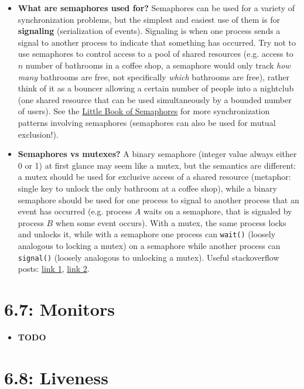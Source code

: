 \documentclass[12pt]{article}
\begin{document}
\begin{itemize}
    \item \textbf{What are semaphores used for?} Semaphores can be used for a variety of synchronization problems, but the simplest and easiest use of them is for \textbf{signaling} (serialization of events). Signaling is when one process sends a signal to another process to indicate that something has occurred. Try not to use semaphores to control access to a pool of shared resources (e.g. access to \(n\) number of bathrooms in a coffee shop, a semaphore would only track \textit{how many} bathrooms are free, not specifically \textit{which} bathrooms are free), rather think of it as a bouncer allowing a certain number of people into a nightclub (one shared resource that can be used simultaneously by a bounded number of users). See the \href{https://greenteapress.com/semaphores/LittleBookOfSemaphores.pdf}{Little Book of Semaphores} for more synchronization patterns involving semaphores (semaphores can also be used for mutual exclusion!).
    \item \textbf{Semaphores vs mutexes?} A binary semaphore (integer value always either 0 or 1) at first glance may seem like a mutex, but the semantics are different: a mutex should be used for exclusive access of a shared resource (metaphor: single key to unlock the only bathroom at a coffee shop), while a binary semaphore should be used for one process to signal to another process that an event has occurred (e.g. process \(A\) waits on a semaphore, that is signaled by process \(B\) when some event occurs). With a mutex, the same process locks and unlocks it, while with a semaphore one process can \texttt{wait()} (loosely analogous to locking a mutex) on a semaphore while another process can \texttt{signal()} (loosely analogous to unlocking a mutex). Useful stackoverflow posts: \href{https://stackoverflow.com/a/86021/7162381}{link 1}, \href{https://stackoverflow.com/a/40238/7162381}{link 2}.
\end{itemize}

\section*{6.7: Monitors}

\begin{itemize}
    \item \textbf{TODO}
\end{itemize}

\section*{6.8: Liveness}
\end{document}
